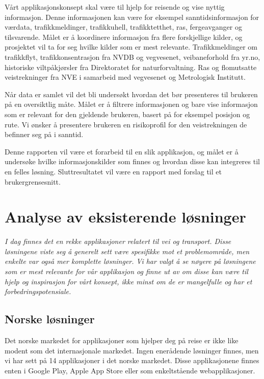 \documentclass[a4paper,norsk,oneside]{book}
\begin{document}
Vårt applikasjonskonsept skal være til hjelp for reisende og vise nyttig informasjon.  Denne informasjonen kan være for eksempel sanntidsinformasjon for værdata, trafikkmeldinger, trafikkuhell, trafikktetthet, ras, fergeavganger og tilsvarende. Målet er å koordinere informasjon fra flere forskjellige kilder, og prosjektet vil ta for seg hvilke kilder som er mest relevante. Trafikkmeldinger om trafikkflyt,  trafikkonsentrasjon fra NVDB og vegvesenet, veibaneforhold fra yr.no, historiske viltpåkjørsler fra Direktoratet for naturforvaltning. Ras og flomutsatte veistrekninger fra NVE i samarbeid med vegvesenet og Metrologisk Institutt.
	
Når data er samlet vil det bli undersøkt hvordan det bør presenteres til brukeren på en oversiktlig måte. Målet er å filtrere informasjonen og bare vise informasjon som er relevant for den gjeldende brukeren, basert på for eksempel posisjon og rute. Vi ønsker å presentere brukeren en risikoprofil for den veistrekningen de befinner seg på i sanntid.

Denne rapporten vil være et forarbeid til en slik applikasjon, og målet er å undersøke hvilke informasjonskilder som finnes og hvordan disse kan integreres til en felles løsning. Sluttresultatet vil være en rapport med forslag til et brukergrensesnitt. 

\chapter{ Analyse av eksisterende løsninger}\label{T-B}
\label{cha:TheoryAndBackground}

{\it I dag finnes det en rekke applikasjoner relatert til vei og transport. Disse løsningene viste seg å generelt sett være spesifikke mot et problemområde, men enkelte var også mer komplette løsninger. Vi har valgt å se nøyere på løsningene som er mest relevante for vår applikasjon og finne ut av om disse kan være til hjelp og inspirasjon for vårt konsept, ikke minst om de er mangelfulle og har et forbedringspotensiale.}


\section{Norske løsninger}
\label{sec:no1}

Det norske markedet for applikasjoner som hjelper deg på reise er ikke like modent som det internasjonale markedet. Ingen enerådende løsninger finnes, men vi har sett på 14 applikasjoner i det norske markedet. Disse applikasjonene finnes enten i Google Play, Apple App Store eller som enkeltstående webapplikasjoner.
\end{document}
